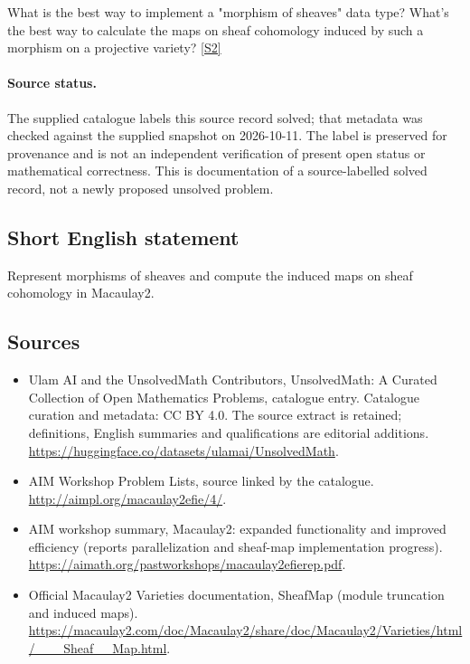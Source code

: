 \documentclass[11pt]{article}
\newcommand{\sref}[2]{\hyperlink{source:#1:#2}{[S#2]}}
\begin{document}
What is the best way to implement a "morphism of sheaves" data type? What's the best way to calculate the maps on sheaf cohomology induced by such a morphism on a projective variety? \sref{statement}{2}
\paragraph{Source status.}
The supplied catalogue labels this source record solved; that metadata was checked against the supplied snapshot on 2026-10-11. The label is preserved for provenance and is not an independent verification of present open status or mathematical correctness. This is documentation of a source-labelled solved record, not a newly proposed unsolved problem.
\subsection{Short English statement}
Represent morphisms of sheaves and compute the induced maps on sheaf cohomology in Macaulay2.
\subsection{Sources}
\begin{itemize}
\item[\hypertarget{source:statement:1}{S1}] Ulam AI and the UnsolvedMath Contributors, UnsolvedMath: A Curated Collection of Open Mathematics Problems, catalogue entry. Catalogue curation and metadata: CC BY 4.0. The source extract is retained; definitions, English summaries and qualifications are editorial additions.
\url{https://huggingface.co/datasets/ulamai/UnsolvedMath}.
\item[\hypertarget{source:statement:2}{S2}] AIM Workshop Problem Lists, source linked by the catalogue.
\url{http://aimpl.org/macaulay2efie/4/}.
\item[\hypertarget{source:statement:3}{S3}] AIM workshop summary, Macaulay2: expanded functionality and improved efficiency (reports parallelization and sheaf-map implementation progress).
\url{https://aimath.org/pastworkshops/macaulay2efierep.pdf}.
\item[\hypertarget{source:statement:4}{S4}] Official Macaulay2 Varieties documentation, SheafMap (module truncation and induced maps).
\url{https://macaulay2.com/doc/Macaulay2/share/doc/Macaulay2/Varieties/html/___Sheaf__Map.html}.
\end{itemize}
\end{document}
